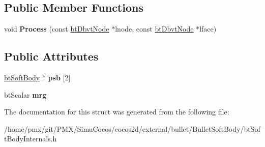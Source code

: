 \subsection*{Public Member Functions}
\begin{DoxyCompactItemize}
\item 
\mbox{\label{structbtSoftColliders_1_1CollideVF__SS_a4c2a3351388fbad778a63dbb3a84564b}} 
void {\bfseries Process} (const \hyperlink{structbtDbvtNode}{bt\+Dbvt\+Node} $\ast$lnode, const \hyperlink{structbtDbvtNode}{bt\+Dbvt\+Node} $\ast$lface)
\end{DoxyCompactItemize}
\subsection*{Public Attributes}
\begin{DoxyCompactItemize}
\item 
\mbox{\label{structbtSoftColliders_1_1CollideVF__SS_a98877778cb52b9599e6ea13d1b6cdeb6}} 
\hyperlink{classbtSoftBody}{bt\+Soft\+Body} $\ast$ {\bfseries psb} \mbox{[}2\mbox{]}
\item 
\mbox{\label{structbtSoftColliders_1_1CollideVF__SS_afddd3ce943cf462b9fa616277d9cea9d}} 
bt\+Scalar {\bfseries mrg}
\end{DoxyCompactItemize}


The documentation for this struct was generated from the following file\+:\begin{DoxyCompactItemize}
\item 
/home/pmx/git/\+P\+M\+X/\+Simu\+Cocos/cocos2d/external/bullet/\+Bullet\+Soft\+Body/bt\+Soft\+Body\+Internals.\+h\end{DoxyCompactItemize}
